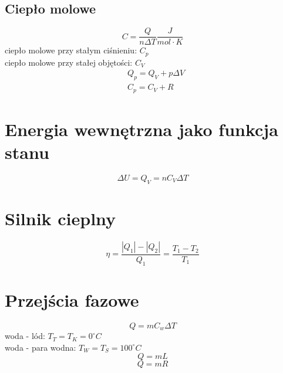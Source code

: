       \subsection{Ciepło molowe}
        \begin{equation}
          C = \frac{Q}{n\Delta T} \unit{\frac{J}{mol\cdot K}}
        \end{equation}
        ciepło molowe przy stałym ciśnieniu: $C_p$\\
        ciepło molowe przy stałej objętości: $C_V$
        \begin{align}
          &Q_p = Q_V + p\Delta V\\
          &C_p = C_V + R
        \end{align}
    \section{Energia wewnętrzna jako funkcja stanu}
      \begin{equation}
        \Delta U = Q_V = nC_V\Delta T
      \end{equation}
      \section{Silnik cieplny}
      \begin{equation}
        \eta = \frac{|Q_1|-|Q_2|}{Q_1} = \frac{T_1 - T_2}{T_1}
      \end{equation}
    \section{Przejścia fazowe}
      \begin{equation}
        Q = mC_w\Delta T
      \end{equation}
      woda - lód: $T_T = T_K = 0^\circ C$\\
      woda - para wodna: $T_W = T_S = 100^\circ C$
      \begin{equation}
        Q = mL
      \end{equation}
      \begin{equation}
        Q = mR
      \end{equation}
